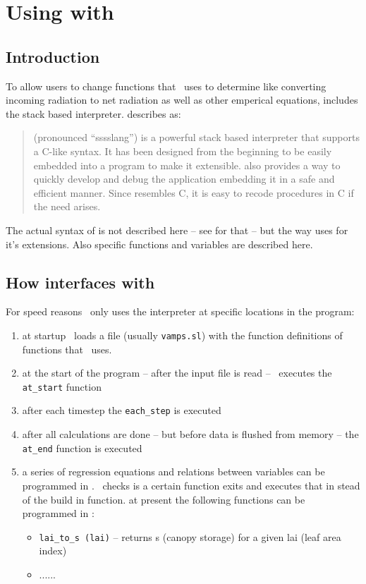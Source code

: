 \chapter{Using \slang{} with \vamps{}}

\section{Introduction}
To allow users to change functions that \vamps\ uses to determine
like converting incoming radiation to net radiation as well as other
emperical equations, \vamps{} includes the \slang{} stack based
interpreter.  describes \slang{} as:
\begin{quote}
\slang{} (pronounced ``sssslang'') is a powerful stack based interpreter
   that supports a C-like syntax.  It has been designed from the beginning
   to be easily embedded into a program to make it extensible. \slang{} also
   provides a way to quickly develop and debug the application embedding it
   in a safe and efficient manner.  Since \slang{} resembles C, it is easy to
   recode \slang{} procedures in C if the need arises.
\end{quote}
The actual syntax of \slang{} is not described here -- see
\cite{davis1995282,davis1995283} for that -- but the way \vamps{} uses
\slang{} for it's extensions. Also \vamps{} specific \slang{} functions
and variables are described here.


\section{How \vamps{} interfaces with \slang{}}

For speed reasons \vamps\ only uses the \slang{} interpreter at
specific locations in the program:

\begin{enumerate}
\item at startup \vamps\ loads a file (usually {\tt vamps.sl}) with
the function definitions of functions that \vamps\ uses.
\item at the start of the program -- after the input file is read -- \vamps\
executes the {\tt at\_start} function
\item after each timestep the {\tt each\_step} is executed
\item after all calculations are done -- but before data is flushed
from memory -- the {\tt at\_end} function is executed
\item a series of regression equations and relations between variables
can be programmed in \slang{}. \vamps\ checks is a certain \slang{} function
exits and executes that in stead of the build in function. at present the
following functions can be programmed in \slang{}:
\begin{itemize}
\item {\tt lai\_to\_s (lai)} -- returns s (canopy storage) for a given lai (leaf area
index)
\item ......
\end{itemize}
\end{enumerate}



